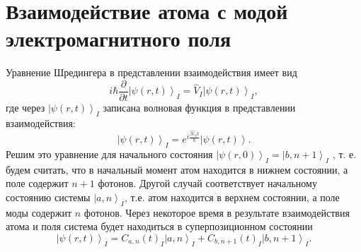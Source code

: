 \section{Взаимодействие атома с модой электромагнитного поля}
Уравнение Шредингера в представлении взаимодействия имеет вид
\begin{equation}
i \hbar \frac{\partial}{\partial t} \left|\psi\left(r, t\right)\right>_I
= \hat{V}_I \left|\psi\left(r, t\right)\right>_I,
\label{eqCh2_Shredinger_inter}
\end{equation}
 где через 
\(
\left|\psi\left(r, t\right)\right>_I
\)
записана волновая функция в представлении взаимодействия:
\begin{equation}
\left|\psi\left(r, t\right)\right>_I = e^{i \frac{\hat{\mathcal{H}}_0
    t}{\hbar}}
\left|\psi\left(r, t\right)\right>.
\label{eqCh2_Psi_inter}
\end{equation}
Решим это уравнение для начального состояния 
$\left|\psi\left(r, 0\right)\right>_I = \left|b, n + 1\right>_I$ , т. е. 
будем считать, что в начальный момент атом находится в нижнем
состоянии, а поле содержит  $n + 1$  фотонов. Другой случай
соответствует начальному состоянию системы  
$\left|a, n\right>_I$,  т.е. атом находится в верхнем
состоянии, а поле моды содержит  $n$  фотонов. Через некоторое время в 
результате взаимодействия атома и поля система будет находиться в
суперпозиционном состоянии  
\begin{equation}
\left|\psi\left(r, t\right)\right>_I = 
C_{a,n}\left(t\right)_I\left|a, n\right>_I +
C_{b,n+1}\left(t\right)_I\left|b, n + 1\right>_I.
\label{eqCh2_OurPsi_inter}
\end{equation}

